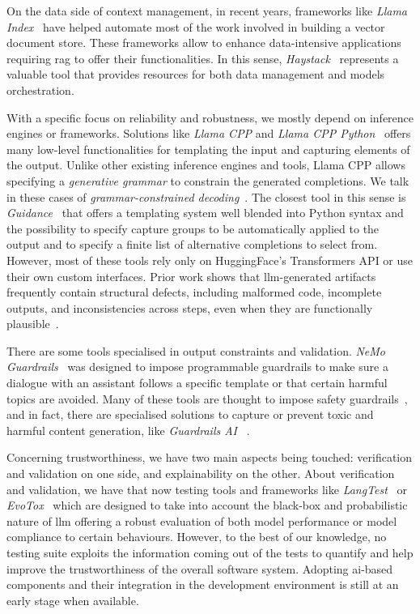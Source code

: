 \documentclass[manuscript,screen]{acmart}
\begin{document}
On the data side of context management, in recent years, frameworks like \emph{Llama Index}~\cite{https://github.com/run-llama/llama_index} have helped automate most of the work involved in building a vector document store.
These frameworks allow to enhance data-intensive applications requiring \ac{rag} to offer their functionalities.
In this sense, \emph{Haystack}~\cite{https://github.com/deepset-ai/haystack} represents a valuable tool that provides resources for both data management and models orchestration.

With a specific focus on reliability and robustness, we mostly depend on inference engines or frameworks.
Solutions like \emph{Llama CPP} and \emph{Llama CPP Python}~\cite{llama.cpp,llama.cpp.python} offers many low-level functionalities for templating the input and capturing elements of the output.
Unlike other existing inference engines and tools, Llama CPP allows specifying a \emph{generative grammar} to constrain the generated completions.
We talk in these cases of \emph{grammar-constrained decoding}~\cite{DBLP:conf/emnlp/GengJP023}.
The closest tool in this sense is \emph{Guidance}~\cite{guidance-ai/guidance} that offers a templating system well blended into Python syntax and the possibility to specify capture groups to be automatically applied to the output and to specify a finite list of alternative completions to select from.
However, most of these tools rely only on HuggingFace's Transformers API or use their own custom interfaces.
Prior work shows that \ac{llm}-generated artifacts frequently contain structural defects, including malformed code, incomplete outputs, and inconsistencies across steps, even when they are functionally plausible~\cite{DBLP:conf/icsm/AbbassiSNK25}.

There are some tools specialised in output constraints and validation.
\emph{NeMo Guardrails}~\cite{DBLP:conf/emnlp/RebedeaDSPC23} was designed to impose programmable guardrails to make sure a dialogue with an assistant follows a specific template or that certain harmful topics are avoided.
Many of these tools are thought to impose safety guardrails~\cite{DBLP:journals/corr/abs-2312-06674}, and in fact, there are specialised solutions to capture or prevent toxic and harmful content generation, like \emph{Guardrails AI} ~\cite{https://www.guardrailsai.com/}.

Concerning trustworthiness, we have two main aspects being touched: verification and validation on one side, and explainability on the other.
About verification and validation, we have that now testing tools and frameworks like \emph{LangTest}~\cite{DBLP:journals/simpa/NazirCCKSMKT24} or \emph{EvoTox}~\cite{DBLP:journals/tse/CorboBDLSC25} which are designed to take into account the black-box and probabilistic nature of \ac{llm} offering a robust evaluation of both model performance or model compliance to certain behaviours.
However, to the best of our knowledge, no testing suite exploits the information coming out of the tests to quantify and help improve the trustworthiness of the overall software system.
Adopting \ac{ai}-based components and their integration in the development environment is still at an early stage when available.
\end{document}

